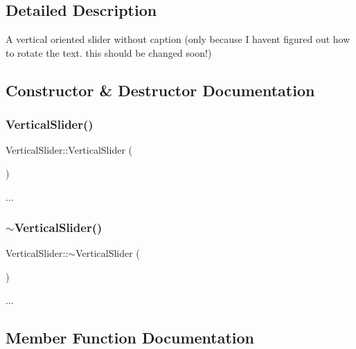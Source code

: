 \subsection{Detailed Description}
A vertical oriented slider without caption (only because I haven\textquotesingle{}t figured out how to rotate the text. this should be changed soon!)  

\subsection{Constructor \& Destructor Documentation}
\mbox{\label{class_vertical_slider_af83ca315bf665ac96d29df5c4e32ecc0}} 
\subsubsection{\texorpdfstring{Vertical\+Slider()}{VerticalSlider()}}
{\footnotesize\ttfamily Vertical\+Slider\+::\+Vertical\+Slider (\begin{DoxyParamCaption}{ }\end{DoxyParamCaption})}

... \mbox{\label{class_vertical_slider_ace98a29d39b256e37628334c2cc69822}} 
\subsubsection{\texorpdfstring{$\sim$\+Vertical\+Slider()}{~VerticalSlider()}}
{\footnotesize\ttfamily Vertical\+Slider\+::$\sim$\+Vertical\+Slider (\begin{DoxyParamCaption}{ }\end{DoxyParamCaption})}

... 

\subsection{Member Function Documentation}
\mbox{\label{class_vertical_slider_a6a5ab2800438817cc5a97c475fad9f2f}} 
